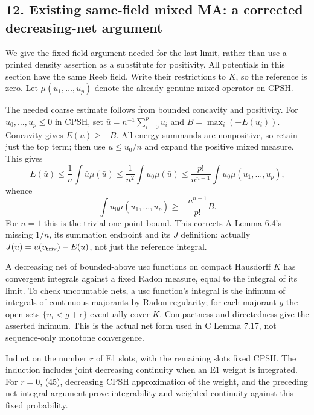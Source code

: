 \documentclass[
  10pt,
]{article}
\begin{document}
\subsection{12. Existing same-field mixed MA: a corrected decreasing-net
argument}\label{existing-same-field-mixed-ma-a-corrected-decreasing-net-argument}

We give the fixed-field argument needed for the last limit, rather than
use a printed density assertion as a substitute for positivity. All
potentials in this section have the same Reeb field. Write their
restrictions to \(K\), so the reference is zero. Let
\(\mu(u_1,\ldots,u_p)\) denote the already genuine mixed operator on
CPSH.

The needed coarse estimate follows from bounded concavity and
positivity. For \(u_0,\ldots,u_p\leq0\) in CPSH, set
\(\bar u=n^{-1}\sum_{i=0}^p u_i\) and \(B=\max_i(-E(u_i))\). Concavity
gives \(E(\bar u)\geq-B\). All energy summands are nonpositive, so
retain just the top term; then use \(\bar u\leq u_0/n\) and expand the
positive mixed measure. This gives \[
 E(\bar u)\leq\frac1n\int\bar u\mu(\bar u)
 \leq\frac1{n^2}\int u_0\mu(\bar u)
 \leq\frac{p!}{n^{n+1}}\int u_0\mu(u_1,\ldots,u_p),
\] whence
\[ \int u_0\mu(u_1,\ldots,u_p)\geq-\frac{n^{n+1}}{p!}B.                                    \tag{45}\]
For \(n=1\) this is the trivial one-point bound. This corrects A Lemma
6.4's missing \(1/n\), its summation endpoint and its \(J\) definition:
actually \(J(u)=u(v_{\rm triv})-E(u)\), not just the reference integral.

A decreasing net of bounded-above usc functions on compact Hausdorff
\(K\) has convergent integrals against a fixed Radon measure, equal to
the integral of its limit. To check uncountable nets, a usc function's
integral is the infimum of integrals of continuous majorants by Radon
regularity; for each majorant \(g\) the open sets \(\{u_i<g+\epsilon\}\)
eventually cover \(K\). Compactness and directedness give the asserted
infimum. This is the actual net form used in C Lemma 7.17, not
sequence-only monotone convergence.

Induct on the number \(r\) of E1 slots, with the remaining slots fixed
CPSH. The induction includes joint decreasing continuity when an E1
weight is integrated. For \(r=0\), (45), decreasing CPSH approximation
of the weight, and the preceding net integral argument prove
integrability and weighted continuity against this fixed probability.
\end{document}
